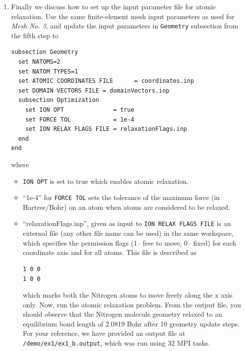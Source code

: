 \begin{enumerate}
\item Finally we discuss how to set up the input parameter file for atomic relaxation. 
Use the same finite-element mesh input parameters as used for \emph{Mesh No. 3}, and update the 
input parameters in \verb|Geometry| subsection from the fifth step to
\begin{verbatim}
subsection Geometry
  set NATOMS=2
  set NATOM TYPES=1
  set ATOMIC COORDINATES FILE      = coordinates.inp 
  set DOMAIN VECTORS FILE = domainVectors.inp
  subsection Optimization
    set ION OPT              = true
    set FORCE TOL            = 1e-4    
    set ION RELAX FLAGS FILE = relaxationFlags.inp
  end
end
\end{verbatim}
where
\begin{itemize}
\item \verb|ION OPT| is set to true which enables atomic relaxation.  		
\item ``1e-4'' for \verb|FORCE TOL| sets the tolerance of the maximum force (in Hartree/Bohr) on an atom when atoms are
considered to be relaxed.
\item ``relaxationFlags.inp'', given as input to \verb|ION RELAX FLAGS FILE| is an external file (any other file name can be used) in the same workspace, which specifies the permission flags (1-- free to move, 0-- fixed) for each coordinate axis and for all atoms. This file is described as 
\begin{verbatim}
1 0 0
1 0 0
\end{verbatim}
which marks both the Nitrogen atoms to move freely along the x axis only.
Now, run the atomic relaxation problem. From the output file, you should observe that the Nitrogen molecule geometry relaxed to
an equilibrium bond length of 2.0819 Bohr after 10 geometry update steps.  For your reference, we have provided an output file at \verb|/demo/ex1/ex1_b.output|, which was run using 32 MPI tasks.
\end{itemize}
\end{enumerate}

